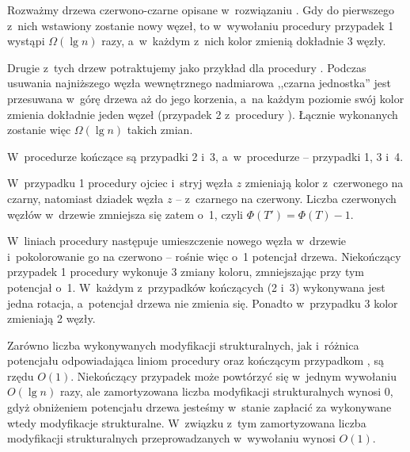 
\subproblem %
Rozważmy drzewa czerwono-czarne opisane w~rozwiązaniu .
Gdy do pierwszego z~nich wstawiony zostanie nowy węzeł, to w~wywołaniu procedury  przypadek 1 wystąpi $\Omega(\lg n)$ razy, a~w~każdym z~nich kolor zmienią dokładnie 3 węzły.

Drugie z~tych drzew potraktujemy jako przykład dla procedury .
Podczas usuwania najniższego węzła wewnętrznego nadmiarowa ,,czarna jednostka'' jest przesuwana w~górę drzewa aż do jego korzenia, a~na każdym poziomie swój kolor zmienia dokładnie jeden węzeł (przypadek 2 z~procedury ).
Łącznie wykonanych zostanie więc $\Omega(\lg n)$ takich zmian.

\subproblem %
W~procedurze  kończące są przypadki 2 i~3, a~w~procedurze  -- przypadki 1, 3 i~4.

\subproblem %
W~przypadku 1 procedury  ojciec i~stryj węzła $z$ zmieniają kolor z~czerwonego na czarny, natomiast dziadek węzła $z$ -- z~czarnego na czerwony.
Liczba czerwonych węzłów w~drzewie zmniejsza się zatem o~1, czyli $\Phi(T')=\Phi(T)-1$.

\subproblem %
W~liniach  procedury  następuje umieszczenie nowego węzła w~drzewie i~pokolorowanie go na czerwono -- rośnie więc o~1 potencjał drzewa.
Niekończący przypadek 1 procedury  wykonuje 3 zmiany koloru, zmniejszając przy tym potencjał o~1.
W~każdym z~przypadków kończących (2 i~3) wykonywana jest jedna rotacja, a~potencjał drzewa nie zmienia się.
Ponadto w~przypadku 3 kolor zmieniają 2 węzły.

\subproblem %
Zarówno liczba wykonywanych modyfikacji strukturalnych, jak i~różnica potencjału odpowiadająca liniom  procedury  oraz kończącym przypadkom , są rzędu $O(1)$.
Niekończący przypadek  może powtórzyć się w~jednym wywołaniu $O(\lg n)$ razy, ale zamortyzowana liczba modyfikacji strukturalnych wynosi 0, gdyż obniżeniem potencjału drzewa jesteśmy w~stanie zapłacić za wykonywane wtedy modyfikacje strukturalne.
W~związku z~tym zamortyzowana liczba modyfikacji strukturalnych przeprowadzanych w~wywołaniu  wynosi $O(1)$.

